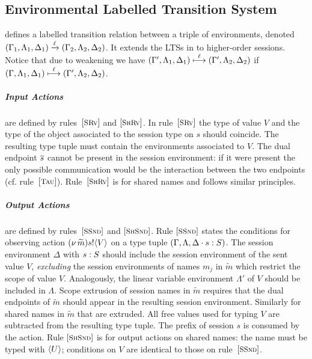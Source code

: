 \documentclass[a4paper,UKenglish]{lipics}
\theoremstyle{definition}
\begin{document}
\subsection{Environmental Labelled Transition System}
\label{ss:elts}
\noi 
{}
defines a labelled transition relation between 
a triple of environments, 
denoted
$(\Gamma_1, \Lambda_1, \Delta_1) \xrightarrow{\ell} (\Gamma_2, \Lambda_2, \Delta_2)$.
It extends the LTSs
in \cite{KYHH2015,KY2015} 
to higher-order sessions. 
Notice that due to weakening %
we have 
$(\Gamma', \Lambda_1, \Delta_1) \stackrel{\ell}{\longmapsto} (\Gamma', \Lambda_2, \Delta_2)$
if
$(\Gamma, \Lambda_1, \Delta_1) \stackrel{\ell}{\longmapsto} (\Gamma', \Lambda_2, \Delta_2)$.



\subparagraph{Input Actions} 
are defined by 
rules~$\eltsrule{SRv}$ and $\eltsrule{ShRv}$.
In rule~$\eltsrule{SRv}$
the type of value $V$
and the type of the object associated to the session type on $s$ 
should coincide. 
The resulting type tuple must contain the environments 
associated to $V$. 
The %
dual endpoint $\overline{s}$ cannot be
present in the session environment: if it were present
the only possible communication would be the interaction
between the two endpoints (cf. rule~$\eltsrule{Tau}$).
Rule~$\eltsrule{ShRv}$ is for shared names and follows similar principles.

\subparagraph{Output Actions} are defined by rules~$\eltsrule{SSnd}$
and $\eltsrule{ShSnd}$.  
Rule $\eltsrule{SSnd}$ states the conditions for observing action
$(\nu\, \widetilde{m}) s ! \langle V \rangle$ on a type tuple 
$(\Gamma, \Lambda, \Delta\cdot s : S)$. 
The session environment $\Delta$ with $s : S$ 
should include the session environment of the sent value $V$, 
{\em excluding} the session environments of names $m_j$ 
in $\widetilde{m}$ which restrict the scope of value $V$. 
Analogously, the linear variable environment 
$\Lambda'$ of $V$ should be included in $\Lambda$. 
Scope extrusion of session names in $\widetilde{m}$ requires
that the dual endpoints of $\widetilde{m}$ should appear in
the resulting session environment. Similarly for shared 
names in $\widetilde{m}$ that are extruded.  
All free values used for typing $V$ are subtracted from the
resulting type tuple. The prefix of session $s$ is consumed
by the action.
Rule $\eltsrule{ShSnd}$ is for output actions on shared names:
the name must be typed with $\langle U \rangle$; conditions on $V$ are identical to those
on rule~$\eltsrule{SSnd}$.
\end{document}
